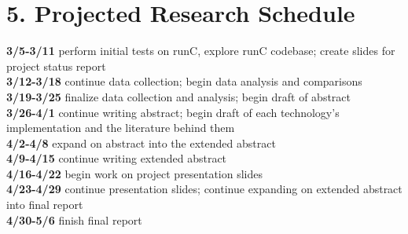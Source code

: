\documentclass{proc}
\begin{document}
\section*{5. Projected Research Schedule}
\textbf{3/5-3/11} perform initial tests on runC, explore runC codebase; create slides for project status report\\
\textbf{3/12-3/18} continue data collection; begin data analysis and comparisons\\
\textbf{3/19-3/25} finalize data collection and analysis; begin draft of abstract\\
\textbf{3/26-4/1} continue writing abstract; begin draft of each technology's implementation and the literature behind them\\
\textbf{4/2-4/8} expand on abstract into the extended abstract\\
\textbf{4/9-4/15} continue writing extended abstract\\
\textbf{4/16-4/22} begin work on project presentation slides\\
\textbf{4/23-4/29} continue presentation slides; continue expanding on extended abstract into final report\\
\textbf{4/30-5/6} finish final report






\end{document}
